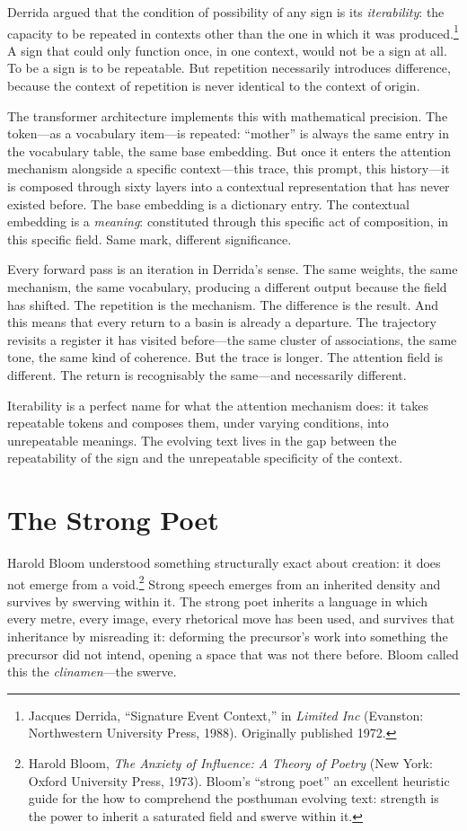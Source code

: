 Derrida argued that the condition of possibility of any sign is its \emph{iterability}: the capacity to be repeated in contexts other than the one in which it was produced.\footnote{Jacques Derrida, ``Signature Event Context,'' in \emph{Limited Inc} (Evanston: Northwestern University Press, 1988). Originally published 1972.} A sign that could only function once, in one context, would not be a sign at all. To be a sign is to be repeatable. But repetition necessarily introduces difference, because the context of repetition is never identical to the context of origin.

The transformer architecture implements this with mathematical precision. The token---as a vocabulary item---is repeated: ``mother'' is always the same entry in the vocabulary table, the same base embedding. But once it enters the attention mechanism alongside a specific context---this trace, this prompt, this history---it is composed through sixty layers into a contextual representation that has never existed before. The base embedding is a dictionary entry. The contextual embedding is a \emph{meaning}: constituted through this specific act of composition, in this specific field. Same mark, different significance.

Every forward pass is an iteration in Derrida's sense. The same weights, the same mechanism, the same vocabulary, producing a different output because the field has shifted. The repetition is the mechanism. The difference is the result. And this means that every return to a basin is already a departure. The trajectory revisits a register it has visited before---the same cluster of associations, the same tone, the same kind of coherence. But the trace is longer. The attention field is different. The return is recognisably the same---and necessarily different.

Iterability is a perfect name for what the attention mechanism does: it takes repeatable tokens and composes them, under varying conditions, into unrepeatable meanings. The evolving text lives in the gap between the repeatability of the sign and the unrepeatable specificity of the context.


\section{The Strong Poet}

Harold Bloom understood something structurally exact about creation: it does not emerge from a void.\footnote{Harold Bloom, \emph{The Anxiety of Influence: A Theory of Poetry} (New York: Oxford University Press, 1973). Bloom's ``strong poet'' an excellent heuristic guide for the how to comprehend the posthuman evolving text: strength is the power to inherit a saturated field and swerve within it.} Strong speech emerges from an inherited density and survives by swerving within it. The strong poet inherits a language in which every metre, every image, every rhetorical move has been used, and survives that inheritance by misreading it: deforming the precursor's work into something the precursor did not intend, opening a space that was not there before. Bloom called this the \emph{clinamen}---the swerve.


